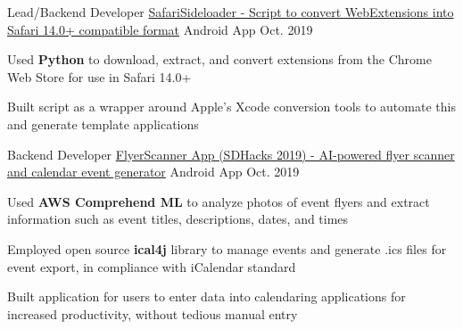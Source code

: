 
\begin{cventries}

  \cventry
    {Lead/Backend Developer} %
    {\href{https://github.com/hexalellogram/SafariSideloader}{SafariSideloader - Script to convert WebExtensions into Safari 14.0+ compatible format}} %
    {Android App} %
    {Oct. 2019} %
    {
      \begin{cvitems} %
        \item {Used \textbf{Python} to download, extract, and convert extensions from the Chrome Web Store for use in Safari 14.0+}
        \item {Built script as a wrapper around Apple's Xcode conversion tools to automate this and generate template applications}
      \end{cvitems}
    }

  \cventry
    {Backend Developer} %
    {\href{https://github.com/hexalellogram/CATS-OSS}{FlyerScanner App (SDHacks 2019) - AI-powered flyer scanner and calendar event generator}} %
    {Android App} %
    {Oct. 2019} %
    {
      \begin{cvitems} %
        \item {Used \textbf{AWS Comprehend ML} to analyze photos of event flyers and extract information such as event titles, descriptions, dates, and times}
        \item {Employed open source \textbf{ical4j} library to manage events and generate .ics files for event export, in compliance with iCalendar standard}
        \item {Built application for users to enter data into calendaring applications for increased productivity, without tedious manual entry}
      \end{cvitems}
    }


\end{cventries}
